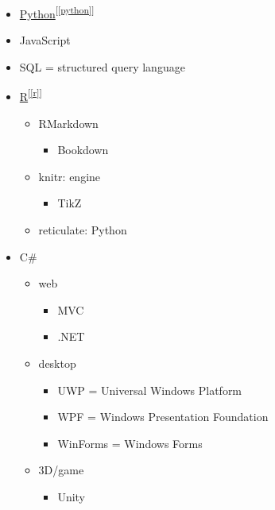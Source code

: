 \documentclass[
]{book}
\providecommand{\tightlist}{%
  \setlength{\itemsep}{0pt}\setlength{\parskip}{0pt}}
\theoremstyle{definition}
\theoremstyle{definition}
\theoremstyle{definition}
\theoremstyle{definition}
\theoremstyle{remark}
\begin{document}
\begin{itemize}
\tightlist
\item
  \protect\hyperlink{python}{Python}\textsuperscript{{[}\ref{python}{]}}
\item
  JavaScript
\item
  SQL = structured query language
\item
  \protect\hyperlink{r}{R}\textsuperscript{{[}\ref{r}{]}}

  \begin{itemize}
  \tightlist
  \item
    RMarkdown

    \begin{itemize}
    \tightlist
    \item
      Bookdown
    \end{itemize}
  \item
    knitr: engine

    \begin{itemize}
    \tightlist
    \item
      TikZ
    \end{itemize}
  \item
    reticulate: Python
  \end{itemize}
\item
  C\#

  \begin{itemize}
  \tightlist
  \item
    web

    \begin{itemize}
    \tightlist
    \item
      MVC
    \item
      .NET
    \end{itemize}
  \item
    desktop

    \begin{itemize}
    \tightlist
    \item
      UWP = Universal Windows Platform
    \item
      WPF = Windows Presentation Foundation
    \item
      WinForms = Windows Forms
    \end{itemize}
  \item
    3D/game

    \begin{itemize}
    \tightlist
    \item
      Unity
    \end{itemize}
  \end{itemize}
\end{itemize}
\end{document}
